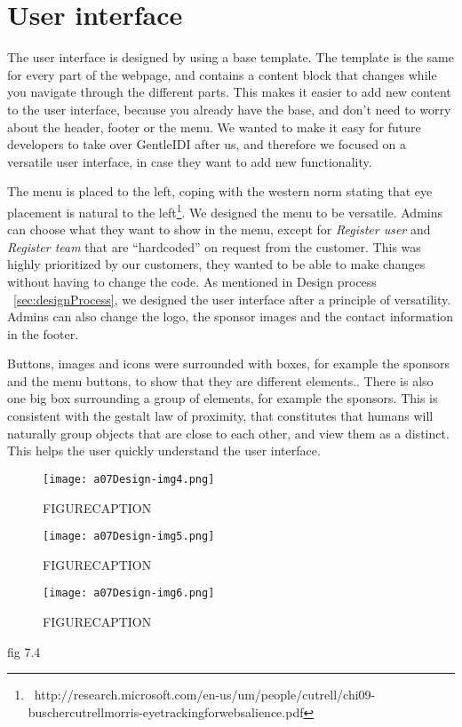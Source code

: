 \section{User interface}

The user interface is designed by using a base template. The template is
the same for every part of the webpage, and contains a content block
that changes while you navigate through the different parts. This makes
it easier to add new content to the user interface, because you already
have the base, and don't need to worry about the
header, footer or the menu. We wanted to make it easy for future
developers to take over GentleIDI after us, and therefore we focused on
a versatile user interface, in case they want to add new functionality.

The menu is placed to the left, coping with the western norm stating
that eye placement is natural to the
left\footnote{\ http://research.microsoft.com/en-us/um/people/cutrell/chi09-buschercutrellmorris-eyetrackingforwebsalience.pdf}.
We designed the menu to be versatile. Admins can choose what they want
to show in the menu, except for \textit{Register user} and
\textit{Register team }that are
``hardcoded'' on request from the
customer. This was highly prioritized by our customers, they wanted to
be able to make changes without having to change the code. As mentioned
in Design process ~\ref{sec:designProcess}, we designed the user interface after a principle
of versatility. Admins can also change the logo, the sponsor images and
the contact information in the footer.

Buttons, images and icons were surrounded with boxes, for example the
sponsors and the menu buttons, to show that they are different
elements.. There is also one big box surrounding a group of elements,
for example the sponsors. This is consistent with the gestalt law of
proximity, that constitutes that humans will naturally group objects
that are close to each other, and view them as a distinct.
This helps the user quickly understand the user interface.


 \begin{figure}[h!]
	\texttt{[image: a07Design-img4.png]} 
	\caption{FIGURECAPTION}
\end{figure}
\begin{figure}[h!]
	\texttt{[image: a07Design-img5.png]} 
	\caption{FIGURECAPTION}
\end{figure}
\begin{figure}[h!]
	\texttt{[image: a07Design-img6.png]} 
	\caption{FIGURECAPTION}
\end{figure}
fig 7.4

